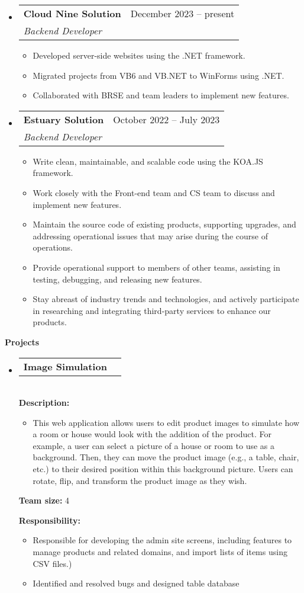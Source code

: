 \documentclass[letterpaper,12pt]{article}[leftmargin=*]
\makeatletter
\def \entryspacing {-0pt}
\renewcommand{\section}[2]{\vspace{5pt}
  \colorbox{secondary}{\color{white}\raggedbottom\normalsize\textbf{{#1}{\hspace{7pt}#2}}}
}
\newcommand{\resumeEntryStart}{\begin{itemize}[leftmargin=2.5mm]}
\newcommand{\resumeEntryEnd}{\end{itemize}\vspace{\entryspacing}}
\newcommand{\resumeItemListStart}{\begin{itemize}[leftmargin=4.5mm]}
\newcommand{\resumeItemListEnd}{\end{itemize}}
\newcommand{\resumeItem}[1]{
  \item\small{
    {#1 \vspace{-2pt}}
  }
}
\newcommand{\resumeEntryTSDL}[4]{
  \vspace{-1pt}\item[]
    \begin{tabularx}{0.97\textwidth}{X@{\hspace{60pt}}r}
      \textbf{\color{primary}#1} & {\firabook\color{accent}\small#2} \\
      \textit{\color{accent}\small#3} & \textit{\color{accent}\small#4} \\
    \end{tabularx}\vspace{-6pt}
}
\newcommand{\resumeEntryTD}[2]{
  \vspace{-1pt}\item[]
    \begin{tabularx}{0.97\textwidth}{X@{\hspace{60pt}}r}
      \textbf{\color{primary}#1} & {\firabook\color{accent}\small#2} \\
    \end{tabularx}\vspace{-6pt}
}
\makeatother
\begin{document}
  \resumeEntryStart
    \resumeEntryTSDL
      {Cloud Nine Solution}{December 2023 -- present}
      {Backend Developer}{}
    \resumeItemListStart
      \resumeItem {Developed server-side websites using the .NET framework.}
      \resumeItem{Migrated projects from VB6 and VB.NET to WinForms using .NET.}
      \resumeItem{Collaborated with BRSE and team leaders to implement new features.}
    \resumeItemListEnd
    \resumeEntryTSDL
      {Estuary Solution}{October 2022 -- July 2023}
      {Backend Developer}{}
    \resumeItemListStart
      \resumeItem {Write clean, maintainable, and scalable code using the KOA.JS framework.}
      \resumeItem {Work closely with the Front-end team and CS team to discuss and implement new features.}
      \resumeItem {Maintain the source code of existing products, supporting upgrades, and addressing operational issues that may arise during the course of operations.}
      \resumeItem{Provide operational support to members of other teams, assisting in testing, debugging, and releasing new features.}
      \resumeItem{Stay abreast of industry trends and technologies, and actively participate in researching and integrating third-party services to enhance our products.}
    \resumeItemListEnd
  \resumeEntryEnd

\section{\faFlask}{Projects}


  \resumeEntryStart
    \resumeEntryTD
      { Image Simulation}{}

        \textbf{\\Description: }
        
            \resumeItemListStart
              \resumeItem {This web application allows users to edit product images to simulate how a room or house would look with the addition of the product. For example, a user can select a picture of a house or room to use as a background. Then, they can move the product image (e.g., a table, chair, etc.) to their desired position within this background picture. Users can rotate, flip, and transform the product image as they wish.}
            \resumeItemListEnd


        \textbf{Team size: }4

        
        \textbf{Responsibility: }
            \resumeItemListStart
                \resumeItem{Responsible for developing the admin site screens, including features to manage products and related domains, and import lists of items using CSV files.)}
                \resumeItem{Identified and resolved bugs and designed table database}
            \resumeItemListEnd
  \resumeEntryEnd
  
\end{document}
